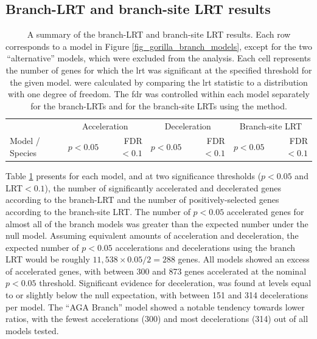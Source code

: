 \subsection{Branch-LRT and branch-site LRT results}

\begin{table}
\centering \scriptsize
\begin{tabular}{lrrrrrr}
\toprule
 & \multicolumn{2}{c}{Acceleration} & \multicolumn{2}{c}{Deceleration} & \multicolumn{2}{c}{Branch-site LRT} \\
Model / Species & $p<0.05$ & FDR$<0.1$ & $p<0.05$ & FDR$<0.1$ & $p<0.05$ & FDR$<0.1$ \\
  \midrule


\bottomrule
\end{tabular}
\caption{A summary of the branch-LRT and branch-site LRT results. Each
  row corresponds to a model in Figure
  \ref{fig_gorilla_branch_models}, except for the two ``alternative''
  models, which were excluded from the analysis. Each cell represents
  the number of genes for which the \ac{lrt} was significant at the
  specified threshold for the given model. \pvs were calculated by
  comparing the \ac{lrt} statistic to a \chisq distribution with one
  degree of freedom. The \acf{fdr} was controlled within each model
  separately for the branch-LRTs and for the branch-site LRTs using
  the \citet{Benjamini1995} method.}
\label{table_gorilla_lrt_results}
\end{table}

Table \ref{table_gorilla_lrt_results} presents for each model, and at
two significance thresholds ($p<0.05$ and LRT$<0.1$), the number of
significantly accelerated and decelerated genes according to the
branch-LRT and the number of positively-selected genes according to
the branch-site LRT. The number of $p<0.05$ accelerated genes for
almost all of the branch models was greater than the expected number
under the null model. Assuming equivalent amounts of acceleration and
deceleration, the expected number of $p<0.05$ accelerations and
decelerations using the branch LRT would be roughly
$11,538\times0.05/2=288$ genes. All models showed an excess of
accelerated genes, with between 300 and 873 genes accelerated at the
nominal $p<0.05$ threshold. Significant evidence for deceleration, was
found at levels equal to or slightly below the null expectation, with
between 151 and 314 decelerations per model. The ``AGA Branch'' model
showed a notable tendency towards lower \dnds ratios, with the fewest
accelerations (300) and most decelerations (314) out of all models
tested.


